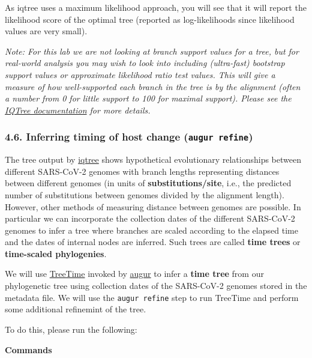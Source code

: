 \documentclass[
]{book}
\begin{document}
As iqtree uses a maximum likelihood approach, you will see that it will report the likelihood score of the optimal tree (reported as log-likelihoods since likelihood values are very small).

\emph{Note: For this lab we are not looking at branch support values for a tree, but for real-world analysis you may wish to look into including (ultra-fast) bootstrap support values or approximate likelihood ratio test values. This will give a measure of how well-supported each branch in the tree is by the alignment (often a number from 0 for little support to 100 for maximal support). Please see the \href{http://www.iqtree.org/doc/Tutorial\#assessing-branch-supports-with-ultrafast-bootstrap-approximation}{IQTree documentation} for more details.}

\subsubsection{\texorpdfstring{4.6. Inferring timing of host change (\texttt{augur\ refine})}{4.6. Inferring timing of host change (augur refine)}}\label{inferring-timing-of-host-change-augur-refine}

The tree output by \href{http://www.iqtree.org/}{iqtree} shows hypothetical evolutionary relationships between different SARS-CoV-2 genomes with branch lengths representing distances between different genomes (in units of \textbf{substitutions/site}, i.e., the predicted number of substitutions between genomes divided by the alignment length). However, other methods of measuring distance between genomes are possible. In particular we can incorporate the collection dates of the different SARS-CoV-2 genomes to infer a tree where branches are scaled according to the elapsed time and the dates of internal nodes are inferred. Such trees are called \textbf{time trees} or \textbf{time-scaled phylogenies}.

We will use \href{https://treetime.readthedocs.io/en/latest/}{TreeTime} invoked by \href{https://docs.nextstrain.org/projects/augur/en/stable/index.html}{augur} to infer a \textbf{time tree} from our phylogenetic tree using collection dates of the SARS-CoV-2 genomes stored in the metadata file. We will use the \texttt{augur\ refine} step to run TreeTime and perform some additional refinemint of the tree.

To do this, please run the following:

\textbf{Commands}
\end{document}
